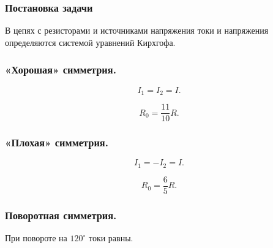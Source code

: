\documentclass[12pt, a4paper]{article}
\begin{document}
\subsubsection*{Постановка задачи}

В цепях с резисторами и источниками напряжения токи и напряжения определяются системой уравнений Кирхгофа.

\subsubsection*{«Хорошая» симметрия.}

\[
I_1 = I_2 = I.
\]

\[
R_0 = \frac{11}{10}R.
\]

\subsubsection*{«Плохая» симметрия.}

\[
I_1 = -I_2 = I.
\]

\[
R_0 = \frac{6}{5}R.
\]

\subsubsection*{Поворотная симметрия.}

При повороте на $120^\circ$ токи равны.
\end{document}

